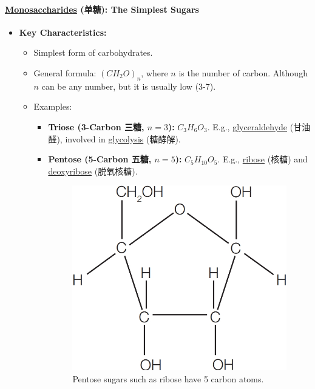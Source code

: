 \paragraph{\underline{Monosaccharides} (单糖): The Simplest Sugars}
\begin{itemize}
    \item \textbf{Key Characteristics:}
    \begin{itemize}
        \item Simplest form of carbohydrates.
        \item General formula: $\left(CH_2O\right)_n$, where $n$ is the number of carbon. Although $n$ can be any number, but it
        is usually low (3-7).
        \item Examples:
        \begin{itemize}
            \item \textbf{Triose (3-Carbon 三糖, $n=3$):} $C_3H_6O_3$. E.g., \underline{glyceraldehyde} (甘油醛), involved in
            \underline{glycolysis} (糖酵解).
            \item \textbf{Pentose (5-Carbon 五糖, $n=5$):} $C_5H_{10}O_5$. E.g., \underline{ribose} (核糖) and
            \underline{deoxyribose} (脱氧核糖).
            \begin{figure}[H]
                \centering
                \includegraphics[scale=0.2]{Biology/1A/Images/1A-2-2.png}
                \caption{Pentose sugars such as ribose have 5 carbon atoms.}
            \end{figure}

\end{itemize}
\end{itemize}
\end{itemize}
